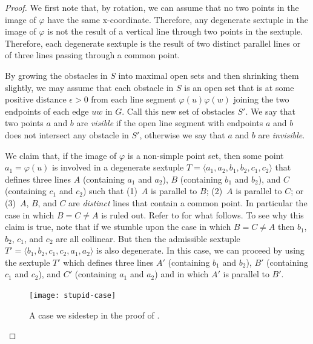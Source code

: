 \documentclass{patmorin}
\begin{document}
\begin{proof}
  We first note that, by rotation, we can assume that no two points in
  the image of $\varphi$ have the same x-coordinate.  Therefore, any
  degenerate sextuple in the image of $\varphi$ is not the result of
  a vertical line through two points in the sextuple.  Therefore, each
  degenerate sextuple is the result of two distinct parallel lines or of
  three lines passing through a common point.

  By growing the obstacles in $S$ into maximal open sets and then
  shrinking them slightly, we may assume that each obstacle in $S$ is
  an open set that is at some positive distance $\epsilon >0$ from each
  line segment $\varphi(u)\varphi(w)$ joining the two endpoints of each
  edge $uw$ in $G$.  Call this new set of obstacles $S'$.  We say that
  two points $a$ and $b$ are \emph{visible} if the open line segment
  with endpoints $a$ and $b$ does not intersect any obstacle in $S'$,
  otherwise we say that $a$ and $b$ are \emph{invisible}.

  We claim that, if the image of $\varphi$ is a non-simple point set,
  then some point $a_1=\varphi(u)$ is involved in a degenerate sextuple
  $T=\langle a_1,a_2,b_1,b_2,c_1,c_2\rangle$ that defines three lines $A$
  (containing $a_1$ and $a_2$), $B$ (containing $b_1$ and $b_2$), and
  $C$ (containing $c_1$ and $c_2$) such that (1)~$A$ is parallel to $B$;
  (2)~$A$ is parallel to $C$; or (3)~$A$, $B$, and $C$ are \emph{distinct}
  lines that contain a common point. In particular the case in which
  $B=C\neq A$ is ruled out. Refer to  for what follows.
  To see why this claim is true, note that if we
  stumble upon the case in which $B=C\neq A$ then $b_1$, $b_2$, $c_1$, and
  $c_2$ are all collinear.  But then the admissible sextuple $T'=\langle
  b_1,b_2,c_1,c_2,a_1,a_2\rangle$ is also degenerate.  In this case, we
  can proceed by using the sextuple $T'$ which defines three lines $A'$
  (containing $b_1$ and $b_2$), $B'$ (containing $c_1$ and $c_2$), and
  $C'$ (containing $a_1$ and $a_2$) and in which $A'$ is parallel to $B'$.
  \begin{figure}
    \begin{center}
       \texttt{[image: stupid-case]}
    \end{center}
    \caption{A case we sidestep in the proof of .}
  \end{figure}


\end{proof}
\end{document}
